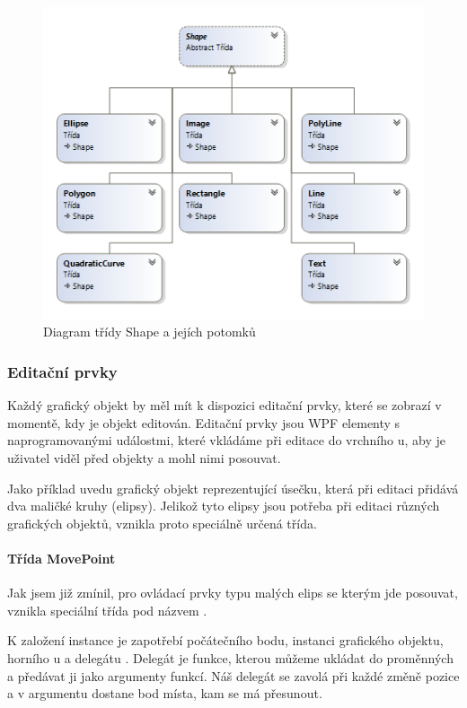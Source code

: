 \documentclass[
  field=inf,
  biblatex=false,
  glossaries,
  index
]{kidiplom}
\begin{document}
\begin{figure}
\includegraphics[width=15cm]{img/shape_diag}
\caption{Diagram třídy Shape a jejích potomků}
\end{figure}  

\subsubsection{Editační prvky}
Každý grafický objekt by měl mít k dispozici editační prvky, které se zobrazí v momentě, kdy je objekt editován. Editační prvky jsou WPF elementy s naprogramovanými událostmi, které vkládáme při editace do vrchního u, aby je uživatel viděl před objekty a mohl nimi posouvat.

Jako příklad uvedu grafický objekt reprezentující úsečku, která při editaci přidává dva maličké kruhy (elipsy). Jelikož tyto elipsy jsou potřeba při editaci různých grafických objektů, vznikla proto speciálně určená třída.

\paragraph{Třída MovePoint}
Jak jsem již zmínil, pro ovládací prvky typu malých elips se kterým jde posouvat, vznikla speciální třída pod názvem .

K založení instance je zapotřebí počátečního bodu, instanci grafického objektu, horního u a delegátu . Delegát je funkce, kterou můžeme ukládat do proměnných a předávat ji jako argumenty funkcí. Náš delegát se zavolá při každé změně pozice a v argumentu dostane bod místa, kam se má přesunout.
\end{document}
